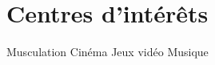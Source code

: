 \documentclass[french]{cv-style}     %
\begin{document}
\section{Centres d'intérêts}
  \vspace{-0.2cm}
\begin{entrylist}
\entry
{Musculation}
\entry
{Cinéma}
\entry
{Jeux vidéo}
\entry
{Musique}
\end{entrylist}
  \vspace{-0.2cm}
\end{document}
